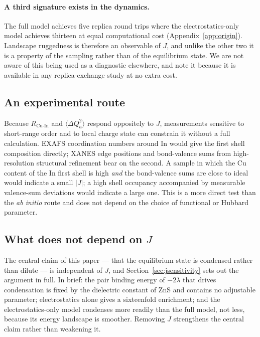 \documentclass[11pt,a4paper]{article}
\newcommand{\dQ}{\Delta Q}
\newcommand{\RCuIn}{R_{\mathrm{Cu\text{-}In}}}
\begin{document}
\paragraph{A third signature exists in the dynamics.} The full model achieves
five replica round trips where the electrostatics-only model achieves thirteen
at equal computational cost (Appendix~\ref{app:origin}). Landscape ruggedness is
therefore an observable of $J$, and unlike the other two it is a property of the
sampling rather than of the equilibrium state. We are not aware of this being
used as a diagnostic elsewhere, and note it because it is available in any
replica-exchange study at no extra cost.

\subsection{An experimental route}

Because $\RCuIn$ and $\langle\dQ_a^2\rangle$ respond oppositely to $J$,
measurements sensitive to short-range order and to local charge state can
constrain it without a full calculation. EXAFS coordination numbers around In
would give the first shell composition directly; XANES edge positions and
bond-valence sums from high-resolution structural refinement bear on the second.
A sample in which the Cu content of the In first shell is high \emph{and} the
bond-valence sums are close to ideal would indicate a small $|J|$; a high shell
occupancy accompanied by measurable valence-sum deviations would indicate a
large one. This is a more direct test than the \textit{ab initio} route and does
not depend on the choice of functional or Hubbard parameter.

\subsection{What does not depend on $J$}

The central claim of this paper --- that the equilibrium state is condensed
rather than dilute --- is independent of $J$, and Section~\ref{sec:jsensitivity}
sets out the argument in full. In brief: the pair binding energy of $-2\lambda$
that drives condensation is fixed by the dielectric constant of ZnS and contains
no adjustable parameter; electrostatics alone gives a sixteenfold enrichment;
and the electrostatics-only model condenses more readily than the full model,
not less, because its energy landscape is smoother. Removing $J$ strengthens the
central claim rather than weakening it.
\end{document}
